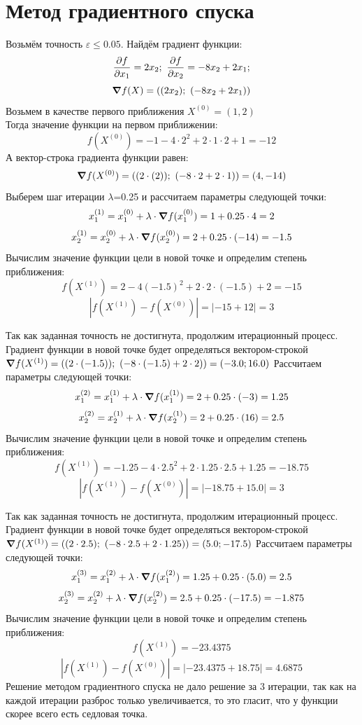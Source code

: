 \documentclass{article}
\begin{document}
\section*{Метод градиентного спуска}
Возьмём точность $\varepsilon \leq 0.05$. Найдём градиент функции:
\[\pdv{f}{x_1} = 2x_2;\ \pdv{f}{x_2} = -8x_2+2x_1;\]
\[\grad f(X) = ((2x_2);\ (-8x_2+2x_1))\]
Возьмем в качестве первого приближения $X^{(0)} = (1, 2)$\\
Тогда значение функции на первом приближении:
\[f(X^{(0)}) = -1-4\cdot 2^2 + 2\cdot 1\cdot 2+ 1 = -12\]
А вектор-строка градиента функции равен:
\[\grad f(X^{(0)}) = ((2\cdot (2));\ (-8\cdot 2+2\cdot 1)) = (4, -14)\]
Выберем шаг итерации $\lambda$=0.25 и рассчитаем параметры следующей точки:
\[x_1^{(1)} = x_1^{(0)}+\lambda \cdot \grad f(x_1^{(0)}) = 1 + 0.25\cdot 4 = 2\]
\[x_2^{(1)} = x_2^{(0)}+\lambda \cdot \grad f(x_2^{(0)}) = 2 + 0.25\cdot (-14) = -1.5\]
Вычислим значение функции цели в новой точке и определим степень приближения:
\[f(X^{(1)}) = 2-4(-1.5)^2+2\cdot 2\cdot (-1.5)+2 = -15\]
\[|f(X^{(1)}) - f(X^{(0)})| = |-15 + 12| = 3\]

Так как заданная точность не достигнута, продолжим
итерационный процесс. Градиент функции в новой точке
будет определяться вектором-строкой $\grad f(X^{(1)}) = ((2\cdot (-1.5));\ (-8\cdot (-1.5)+2\cdot 2)) = (-3.0; 16.0)$
Рассчитаем параметры следующей точки:
\[x_1^{(2)} = x_1^{(1)}+\lambda \cdot \grad f(x_1^{(1)}) = 2 + 0.25\cdot (-3) = 1.25\]
\[x_2^{(2)} = x_2^{(1)}+\lambda \cdot \grad f(x_2^{(1)}) = 2 + 0.25\cdot (16) = 2.5\]
Вычислим значение функции цели в новой точке и определим степень приближения:
\[f(X^{(1)}) = -1.25-4\cdot 2.5^2+2\cdot 1.25\cdot 2.5+1.25 = -18.75\]
\[|f(X^{(1)}) - f(X^{(0)})| = |-18.75 + 15.0| = 3\]

Так как заданная точность не достигнута, продолжим
итерационный процесс. Градиент функции в новой точке
будет определяться вектором-строкой $\grad f(X^{(1)}) = ((2\cdot 2.5);\ (-8\cdot 2.5+2\cdot 1.25)) = (5.0; -17.5)$
Рассчитаем параметры следующей точки:
\[x_1^{(3)} = x_1^{(2)}+\lambda \cdot \grad f(x_1^{(2)}) = 1.25 + 0.25\cdot (5.0) = 2.5\]
\[x_2^{(3)} = x_2^{(2)}+\lambda \cdot \grad f(x_2^{(2)}) = 2.5 + 0.25\cdot (-17.5) = -1.875\]
Вычислим значение функции цели в новой точке и определим степень приближения:
\[f(X^{(1)}) = -23.4375\]
\[|f(X^{(1)}) - f(X^{(0)})| = |-23.4375+18.75| = 4.6875\]
Решение методом градиентного спуска не дало решение за 3 итерации, так как на каждой итерации разброс только увеличивается, то это гласит, что у функции скорее всего есть седловая точка.
\end{document}
